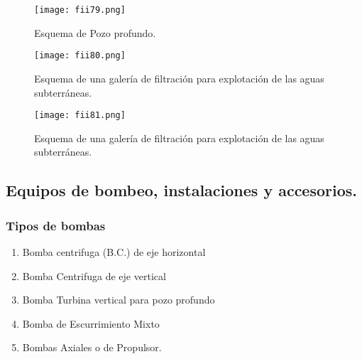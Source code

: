 \begin{figure}[h!]
	\centerline{\texttt{[image: fii79.png]}}
	\caption{Esquema de Pozo profundo.}
	\label{fii79}
\end{figure}

\begin{figure}[h!]
	\centerline{\texttt{[image: fii80.png]}}
	\caption{Esquema de una galería de filtración para explotación de las aguas subterráneas.}
	\label{fii80}
\end{figure}

\begin{figure}[h!]
	\centerline{\texttt{[image: fii81.png]}}
	\caption{Esquema de una galería de filtración para explotación de las aguas subterráneas.}
	\label{fii81}
\end{figure}

\subsection{Equipos de bombeo, instalaciones y accesorios.}

\subsubsection{Tipos de bombas}
\begin{enumerate}
	\item Bomba centrifuga (B.C.) de eje horizontal
	\item Bomba Centrifuga de eje vertical
	\item Bomba Turbina vertical para pozo profundo
	\item Bomba de Escurrimiento Mixto
	\item Bombas Axiales o de Propulsor.
\end{enumerate}

